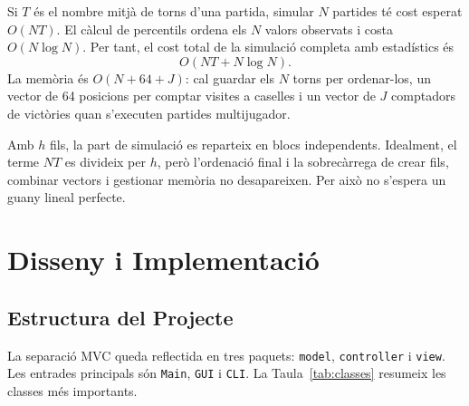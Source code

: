 \documentclass[conference,compsoc]{IEEEtran}
\begin{document}
Si $T$ és el nombre mitjà de torns d'una partida, simular $N$ partides té cost
esperat $O(NT)$. El càlcul de percentils ordena els $N$ valors observats i costa
$O(N\log N)$. Per tant, el cost total de la simulació completa amb estadístics és
\begin{equation}
\label{eq:cost}
O(NT + N\log N).
\end{equation}
La memòria és $O(N+64+J)$: cal guardar els $N$ torns per ordenar-los, un vector de
64 posicions per comptar visites a caselles i un vector de $J$ comptadors de
victòries quan s'executen partides multijugador.

Amb $h$ fils, la part de simulació es reparteix en blocs independents. Idealment,
el terme $NT$ es divideix per $h$, però l'ordenació final i la sobrecàrrega de
crear fils, combinar vectors i gestionar memòria no desapareixen. Per això no
s'espera un guany lineal perfecte.

\section{Disseny i Implementació}

\subsection{Estructura del Projecte}

La separació MVC queda reflectida en tres paquets:
\texttt{model}, \texttt{controller} i \texttt{view}. Les entrades principals són
\texttt{Main}, \texttt{GUI} i \texttt{CLI}. La Taula~\ref{tab:classes} resumeix les
classes més importants.
\end{document}
